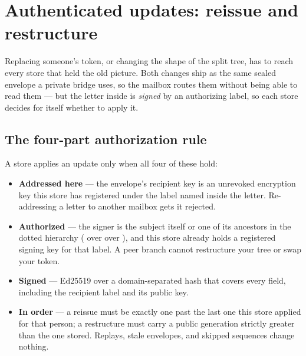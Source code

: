 \section{Authenticated updates: reissue and restructure}
\label{sec:authenticated-updates}

Replacing someone's token, or changing the shape of the split tree, has to
reach every store that held the old picture. Both changes ship as the same
sealed  envelope a private bridge uses, so the mailbox routes
them without being able to read them --- but the letter inside is
\emph{signed} by an authorizing label, so each store decides for itself
whether to apply it.

\subsection{The four-part authorization rule}

A store applies an update only when all four of these hold:

\begin{itemize}
  \item \textbf{Addressed here} --- the envelope's recipient key is an
  unrevoked encryption key this store has registered under the label named
  inside the letter. Re-addressing a letter to another mailbox gets it
  rejected.
  \item \textbf{Authorized} --- the signer is the subject itself or one of
  its ancestors in the dotted hierarchy ( over  over
  ), and this store already holds a registered signing key for
  that label. A peer branch cannot restructure your tree or swap your
  token.
  \item \textbf{Signed} --- Ed25519 over a domain-separated hash that covers
  every field, including the recipient label and its public key.
  \item \textbf{In order} --- a reissue must be exactly one past the last
  one this store applied for that person; a restructure must carry a public
  generation strictly greater than the one stored. Replays, stale
  envelopes, and skipped sequences change nothing.
\end{itemize}

